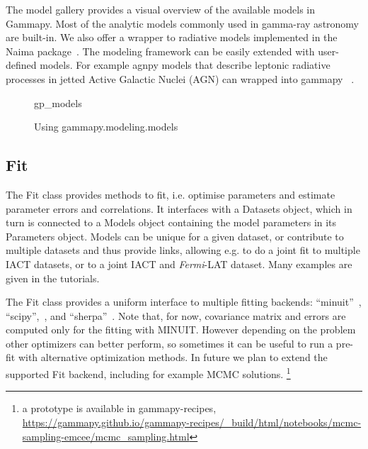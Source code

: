The model gallery provides a visual overview of the available models in
Gammapy. Most of the analytic models  commonly used in gamma-ray astronomy are
built-in. We also offer a wrapper to radiative models implemented in the Naima
package~\cite{naima}. The modeling framework can be easily extended with
user-defined models. For example agnpy models that describe leptonic radiative
processes in jetted Active Galactic Nuclei (AGN) can wrapped into
gammapy~\citep[see section3.5 of ][]{2021arXiv211214573N} .

\begin{figure}
	{gp_models}
	\caption{Using gammapy.modeling.models}
	\label{fig*:minted:gp_models}
\end{figure}

\subsection{Fit}
\label{ssec:fit}

The Fit class provides methods to fit, i.e. optimise parameters and estimate
parameter errors and correlations. It interfaces with a Datasets object, which
in turn is connected to a Models object containing the model parameters in its
Parameters object.  Models can be unique for a given dataset, or contribute to
multiple datasets and thus provide links, allowing e.g. to do a joint fit to
multiple IACT datasets, or to a joint IACT and \textit{Fermi}-LAT dataset. Many
examples are given in the tutorials.

The Fit class provides a uniform interface to multiple fitting backends:
“minuit”~\citep{iminuit}, “scipy”,~\citep{2020SciPy-NMeth}, and
“sherpa”~\citep{sherpa-2005,sherpa-2011}. Note that, for now, covariance matrix
and errors are computed only for the fitting with MINUIT. However depending on
the problem other optimizers can better perform, so sometimes it can be useful
to run a pre-fit with alternative optimization methods. In future we plan to
extend the supported Fit backend, including for example MCMC solutions.
\footnote{a prototype is available in gammapy-recipes,
	\url{https://gammapy.github.io/gammapy-recipes/_build/html/notebooks/mcmc-sampling-emcee/mcmc_sampling.html}
}
